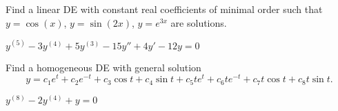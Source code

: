 \begin{exercise}
Find a linear DE with constant real coefficients of minimal order such that $y=\cos(x)$, $y=\sin(2x)$, $y=e^{3x}$ are solutions.
\end{exercise}
\comboSol{%
}
{%
$y^{(5)} - 3y^{(4)} + 5y^{(3)} - 15y'' + 4y' - 12y = 0$
}

\begin{exercise}
Find a homogeneous DE with general solution %
$$y=c_1e^t+ c_2e^{-t}+ c_3\cos t+ c_4\sin t + c_5te^t+ c_6te^{-t}+ c_7t\cos t+ c_8t\sin t.$$
\end{exercise}
\comboSol{%
}
{%
$y^{(8)} - 2y^{(4)} + y = 0$
}



\setcounter{exercise}{100}

